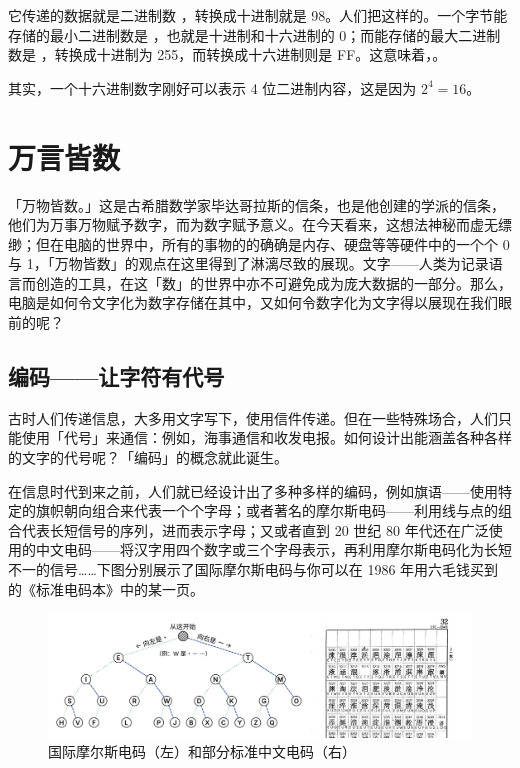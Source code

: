 它传递的数据就是二进制数 ，转换成十进制就是 98。人们把这样的。一个字节能存储的最小二进制数是 ，也就是十进制和十六进制的 0；而能存储的最大二进制数是 ，转换成十进制为 255，而转换成十六进制则是 FF。这意味着，。

\begin{note}
  其实，一个十六进制数字刚好可以表示 4 位二进制内容，这是因为 $2^4=16$。
\end{note}

\section{万言皆数}

「万物皆数。」这是古希腊数学家毕达哥拉斯的信条，也是他创建的学派的信条，他们为万事万物赋予数字，而为数字赋予意义。在今天看来，这想法神秘而虚无缥缈；但在电脑的世界中，所有的事物的的确确是内存、硬盘等等硬件中的一个个 0 与 1，「万物皆数」的观点在这里得到了淋漓尽致的展现。文字——人类为记录语言而创造的工具，在这「数」的世界中亦不可避免成为庞大数据的一部分。那么，电脑是如何令文字化为数字存储在其中，又如何令数字化为文字得以展现在我们眼前的呢？

\subsection{编码——让字符有代号}

古时人们传递信息，大多用文字写下，使用信件传递。但在一些特殊场合，人们只能使用「代号」来通信：例如，海事通信和收发电报。如何设计出能涵盖各种各样的文字的代号呢？「编码」的概念就此诞生。

在信息时代到来之前，人们就已经设计出了多种多样的编码，例如旗语——使用特定的旗帜朝向组合来代表一个个字母；或者著名的摩尔斯电码——利用线与点的组合代表长短信号的序列，进而表示字母；又或者直到 20 世纪 80 年代还在广泛使用的中文电码——将汉字用四个数字或三个字母表示，再利用摩尔斯电码化为长短不一的信号……下图分别展示了国际摩尔斯电码与你可以在 1986 年用六毛钱买到的《标准电码本》中的某一页。

\begin{figure}[htb!]
  \centering
  \includegraphics[width=.85\textwidth]{assets/advanced/TelegraphCode.jpg}
  \caption{国际摩尔斯电码（左）和部分标准中文电码（右）}
  \label{fig:TelegraphCode}
\end{figure}

